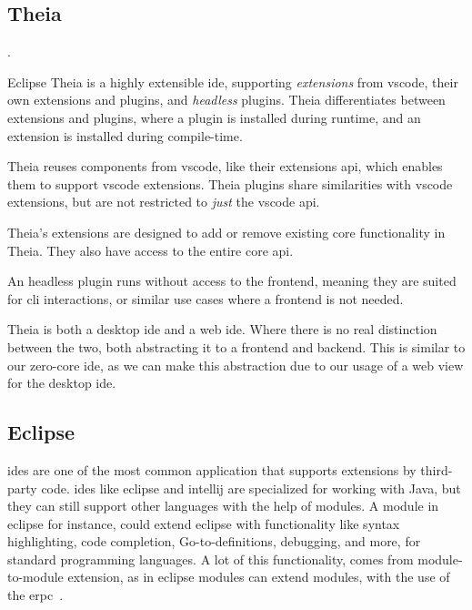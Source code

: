 \subsection{Theia}

.~\cite{theiaIde}

Eclipse Theia is a highly extensible \gls*{ide}, supporting \textit{extensions}
from \gls*{vscode}, their own extensions and plugins, and \textit{headless}
plugins. Theia differentiates between extensions and plugins, where a
plugin is installed during runtime, and an extension is installed during
compile-time.

Theia reuses components from \gls*{vscode}, like their extensions \gls*{api},
which enables them to support \gls*{vscode} extensions. Theia plugins share
similarities with \gls*{vscode} extensions, but are not restricted to
\textit{just} the \gls*{vscode} \gls*{api}.

Theia's extensions are designed to add or remove existing core functionality in
Theia. They also have access to the entire core \gls*{api}.

An headless plugin runs without access to the frontend, meaning they are suited
for \gls*{cli} interactions, or similar use cases where a frontend is not
needed.

Theia is both a desktop \gls*{ide} and a web \gls*{ide}. Where there is no real
distinction between the two, both abstracting it to a frontend and backend. This
is similar to our zero-core \gls*{ide}, as we can make this abstraction due to
our usage of a web view for the desktop \gls*{ide}.

\subsection{Eclipse}

\gls*{ide}s are one of the most common application that supports extensions by
third-party code. \gls*{ide}s like \gls*{eclipse} and \gls*{intellij} are
specialized for working with Java, but they can still support other languages
with the help of modules. A module in \gls*{eclipse} for instance, could extend
\gls*{eclipse} with functionality like syntax highlighting, code completion,
Go-to-definitions, debugging, and more, for standard programming languages.
A lot of this functionality, comes from module-to-module extension, as in
\gls*{eclipse} modules can extend modules, with the use of the \gls*{erpc}~\cite{eclipseRcp}.

